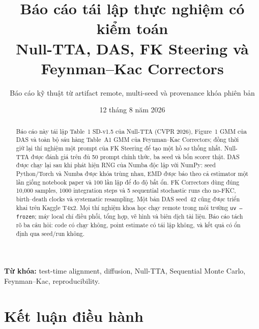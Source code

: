 \documentclass[11pt,a4paper]{article}
\title{\textbf{Báo cáo tái lập thực nghiệm có kiểm toán}\vspace{0.2em}\\
\large Null-TTA, DAS, FK Steering và Feynman--Kac Correctors}
\author{Báo cáo kỹ thuật từ artifact remote, multi-seed và provenance khóa phiên bản}
\date{12 tháng 8 năm 2026}
\newcommand{\code}[1]{\texttt{#1}}
\begin{document}
\maketitle

\begin{abstract}
Báo cáo này tái lập Table~1 SD-v1.5 của Null-TTA (CVPR 2026), Figure~1 GMM của DAS và toàn bộ sáu hàng Table~A1 GMM của Feynman--Kac Correctors; đồng thời giữ lại thí nghiệm một prompt của FK Steering để tạo một hồ sơ thống nhất. Null-TTA được đánh giá trên đủ 50 prompt chính thức, ba seed và bốn scorer thật. DAS được chạy lại sau khi phát hiện RNG của Numba độc lập với NumPy: seed Python/Torch và Numba được khóa trùng nhau, EMD được báo theo cả estimator một lần giống notebook paper và 100 lần lặp để đo độ bất ổn. FK Correctors dùng đúng 10,000 samples, 1000 integration steps và 5 sequential stochastic runs cho no-FKC, birth--death clocks và systematic resampling. Một bản DAS seed~42 cũng được triển khai trên Kaggle T4x2. Mọi thí nghiệm khoa học chạy remote trong môi trường \code{uv --frozen}; máy local chỉ điều phối, tổng hợp, vẽ hình và biên dịch tài liệu. Báo cáo tách rõ ba câu hỏi: code có chạy không, point estimate có tái lập không, và kết quả có ổn định qua seed/run không.
\end{abstract}

\textbf{Từ khóa:} test-time alignment, diffusion, Null-TTA, Sequential Monte Carlo, Feynman--Kac, reproducibility.

\section{Kết luận điều hành}
\end{document}
